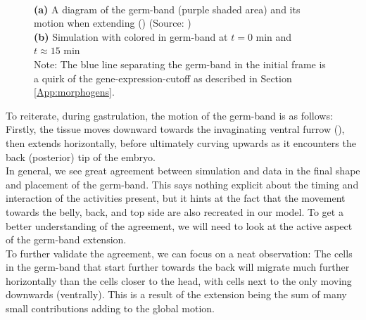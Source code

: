 \begin{figure}[H]
\begin{subfigure}[b]{0.61\textwidth}
    \caption{}
    \end{subfigure}
    \caption{\\
    \textbf{(a)} A diagram of the germ-band (purple shaded area) and its motion when extending () (Source: )\\
    \textbf{(b)} Simulation with colored in germ-band at $t = 0 \text{ min}$ and $t \approx 15 \text{ min}$\\Note: The blue line separating the germ-band in the initial frame is a quirk of the gene-expression-cutoff as described in Section \ref{App:morphogens}.}
    \label{fig:germbandCompare}
\end{figure}



To reiterate, during gastrulation, the motion of the germ-band is as follows:\\Firstly, the tissue moves downward towards the invaginating ventral furrow (), then extends horizontally, before ultimately curving upwards as it encounters the back (posterior) tip of the embryo.\\

In general, we see great agreement between simulation and data in the final shape and placement of the germ-band. This says nothing explicit about the timing and interaction of the activities present, but it hints at the fact that the movement towards the belly, back, and top side are also recreated in our model. To get a better understanding of the agreement, we will need to look at the active aspect of the germ-band extension.\\

To further validate the agreement, we can focus on a neat observation: The cells in the germ-band that start further towards the back will migrate much further horizontally than the cells closer to the head, with cells next to the  only moving downwards (ventrally). This is a result of the extension being the sum of many small contributions adding to the global motion. 

